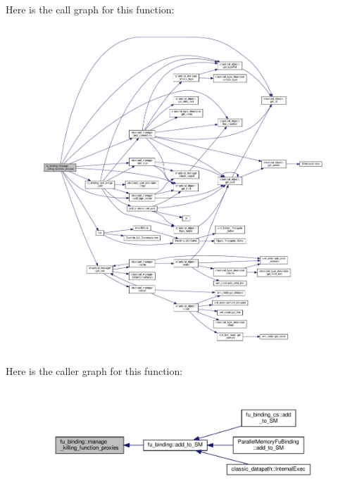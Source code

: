 Here is the call graph for this function\+:
\nopagebreak
\begin{figure}[H]
\begin{center}
\leavevmode
\includegraphics[width=350pt]{d8/d04/classfu__binding_a52c3185e5ef4afdfe83a634eee516fcc_cgraph}
\end{center}
\end{figure}
Here is the caller graph for this function\+:
\nopagebreak
\begin{figure}[H]
\begin{center}
\leavevmode
\includegraphics[width=350pt]{d8/d04/classfu__binding_a52c3185e5ef4afdfe83a634eee516fcc_icgraph}
\end{center}
\end{figure}
\mbox{\label{classfu__binding_aec6b4a61983de5cd4ccb62fa937a67c4}} 
